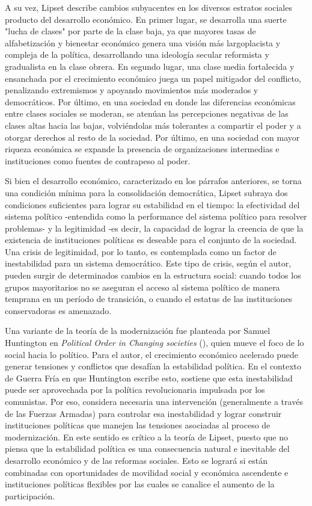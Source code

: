 \documentclass{article}
\begin{document}
A su vez, Lipset describe cambios subyacentes en los diversos estratos sociales producto
del desarrollo económico. En primer lugar, se desarrolla una suerte "lucha de clases" por 
parte de la clase baja, ya que mayores tasas de alfabetización y bienestar económico genera 
una visión más largoplacista y compleja de la política, desarrollando una ideología secular
reformista y gradualista en la clase obrera. En segundo lugar, una clase media fortalecida y 
ensanchada por el crecimiento económico juega un papel mitigador del conflicto, penalizando 
extremismos y apoyando movimientos más moderados y democráticos. Por último, en una sociedad 
en donde las diferencias económicas entre clases sociales se moderan, se atenúan las 
percepciones negativas de las clases altas hacia las bajas, volviéndolas más tolerantes a 
compartir el poder y a otorgar derechos al resto de la sociedad. Por último, en una sociedad 
con mayor riqueza económica se expande la presencia de organizaciones intermedias e 
instituciones como fuentes de contrapeso al poder.

Si bien el desarrollo económico, caracterizado en los párrafos anteriores, se torna una
condición mínima para la consolidación democrática, Lipset subraya dos condiciones 
suficientes para lograr su estabilidad en el tiempo: la efectividad del sistema político 
-entendida como la performance del sistema político para resolver problemas- y la 
legitimidad -es decir, la capacidad de lograr la creencia de que la  existencia de 
instituciones políticas es deseable para el conjunto de la sociedad. Una crisis de 
legitimidad, por lo tanto, es contemplada como un factor de inestabilidad para un sistema 
democrático. Este tipo de crisis, según el autor, pueden surgir de determinados cambios 
en la estructura social: cuando todos los grupos mayoritarios no se aseguran el acceso al 
sistema político de manera temprana en un período de transición, o cuando el estatus de 
las instituciones conservadoras es amenazado.

Una variante de la teoría de la modernización fue planteada por Samuel Huntington 
en \textit{Political Order in Changing societies} (\citeyear{huntington68political}),
quien mueve el foco de lo social hacia lo político. Para el autor, el crecimiento 
económico acelerado puede generar tensiones y conflictos que desafían la estabilidad
política. En el contexto de Guerra Fría en que Huntington escribe esto, sostiene que
esta inestabilidad puede ser aprovechada por la política revolucionaria impulsada por
los comunistas. Por eso, considera necesaria una intervención (generalmente a través
de las Fuerzas Armadas) para controlar esa inestabilidad y lograr construir instituciones
políticas que manejen las tensiones asociadas al proceso de modernización. En este 
sentido es crítico a la teoría de Lipset, puesto que no piensa que la estabilidad política
es una consecuencia natural e inevitable del desarrollo económico y de las reformas 
sociales. Esto se logrará si están combinadas con oportunidades de movilidad social y
económica ascendente e instituciones políticas flexibles por las cuales se canalice
el aumento de la participación.
\end{document}
